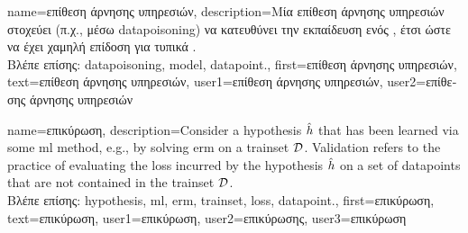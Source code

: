 {name={\foreignlanguage{greek}{επίθεση άρνησης υπηρεσιών}}, 
	description={\foreignlanguage{greek}{Μία} 
		\foreignlanguage{greek}{επίθεση άρνησης υπηρεσιών στοχεύει (π.χ., μέσω} \gls{datapoisoning}) 
		\foreignlanguage{greek}{να κατευθύνει την εκπαίδευση ενός} , 
		\foreignlanguage{greek}{έτσι ώστε να έχει χαμηλή επίδοση για τυπικά} .\\
		\foreignlanguage{greek}{Βλέπε επίσης:} \gls{datapoisoning}, \gls{model}, \gls{datapoint}.},
	first={\foreignlanguage{greek}{επίθεση άρνησης υπηρεσιών}},
	text={\foreignlanguage{greek}{επίθεση άρνησης υπηρεσιών}},
	user1={\foreignlanguage{greek}{επίθεση άρνησης υπηρεσιών}}, %
  	user2={\foreignlanguage{greek}{επίθεσης άρνησης υπηρεσιών}} %
}

{name={\foreignlanguage{greek}{επικύρωση}},
	description={Consider a \gls{hypothesis} $\hat{h}$ that has been 
		learned via some \gls{ml} method, e.g., by solving \gls{erm} on a \gls{trainset} $\mathcal{D}$. 
		Validation refers to the practice of evaluating the \gls{loss} incurred by the 
		\gls{hypothesis} $\hat{h}$ on a set of 
		\gls{datapoint}s that are not contained in the \gls{trainset} $\mathcal{D}$.\\
		\foreignlanguage{greek}{Βλέπε επίσης:} \gls{hypothesis}, \gls{ml}, \gls{erm}, \gls{trainset}, \gls{loss}, \gls{datapoint}.},
		first={\foreignlanguage{greek}{επικύρωση}},
		text={\foreignlanguage{greek}{επικύρωση}},
		user1={\foreignlanguage{greek}{επικύρωση}}, %
		user2={\foreignlanguage{greek}{επικύρωσης}}, %
		user3={\foreignlanguage{greek}{επικύρωση}} %
}

